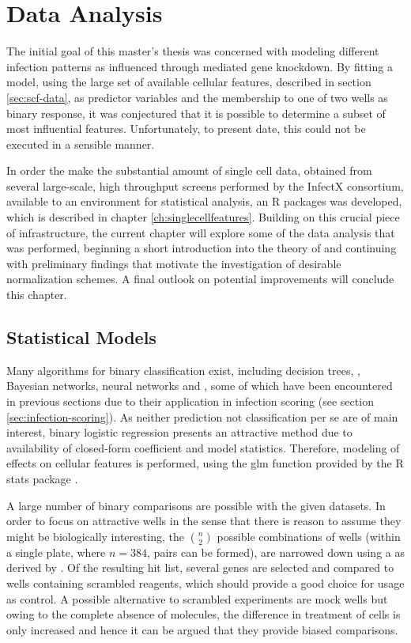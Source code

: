 \chapter{Data Analysis}
\label{ch:data-analysis}

The initial goal of this master's thesis was concerned with modeling different infection patterns as influenced through  mediated gene knockdown. By fitting a  model, using the large set of available cellular features, described in section \ref{sec:scf-data}, as predictor variables and the membership to one of two wells as binary response, it was conjectured that it is possible to determine a subset of most influential features. Unfortunately, to present date, this could not be executed in a sensible manner.

In order the make the substantial amount of single cell data, obtained from several large-scale, high throughput  screens performed by the InfectX consortium, available to an environment for statistical analysis, an R packages was developed, which is described in chapter \ref{ch:singlecellfeatures}. Building on this crucial piece of infrastructure, the current chapter will explore some of the data analysis that was performed, beginning a short introduction into the theory of  and continuing with preliminary findings that motivate the investigation of desirable normalization schemes. A final outlook on potential improvements will conclude this chapter.

\section{Statistical Models}
Many algorithms for binary classification exist, including decision trees, , Bayesian networks, neural networks and , some of which have been encountered in previous sections due to their application in infection scoring (see section \ref{sec:infection-scoring}). As neither prediction not classification per se are of main interest, binary logistic regression presents an attractive method due to availability of closed-form coefficient and model statistics. Therefore, modeling of  effects on cellular features is performed, using the glm function provided by the R stats package \citep{RCoreTeam2015}.

A large number of binary comparisons are possible with the given datasets. In order to focus on attractive wells in the sense that there is reason to assume they might be biologically interesting, the $n \choose 2$ possible combinations of wells (within a single plate, where $n=384$,  pairs can be formed), are narrowed down using a  as derived by \citet{Ramo2014}. Of the resulting hit list, several genes are selected and compared to wells containing scrambled  reagents, which should provide a good choice for usage as control. A possible alternative to scrambled experiments are mock wells but owing to the complete absence of  molecules, the difference in treatment of cells is only increased and hence it can be argued that they provide biased comparisons.

